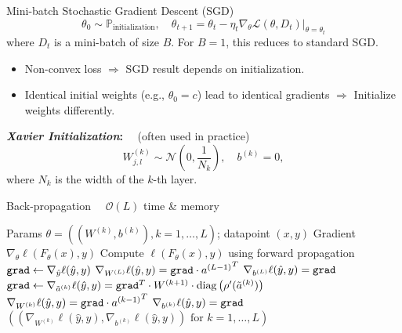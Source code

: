 \documentclass[a4paper,10pt]{article}
\newenvironment{myitemize}
{\vspace{-0.25cm}\begin{itemize}}
{\end{itemize}}
\begin{document}
\begin{small}
\begin{subbox}{Mini-batch Stochastic Gradient Descent (SGD)}
    \vspace{-0.3cm}
    $$
    \theta_0 \sim \mathbb{P}_{\text{initialization}}, \quad \theta_{t+1} = \theta_t - \eta_t \nabla_{\theta} \mathcal{L}(\theta, D_{t}) \big|_{\theta = \theta_t}
    $$
    where \( D_t \) is a mini-batch of size \( B \). For \( B = 1 \), this reduces to standard SGD.
\end{subbox}

\begin{myitemize}
    \item Non-convex loss $\Rightarrow$ SGD result depends on initialization.
    \item Identical initial weights (e.g., $\theta_0 = c$) lead to identical gradients $\Rightarrow$ Initialize weights differently.
\end{myitemize}

\textbf{\textit{Xavier Initialization}:} \ \ (often used in practice)
$$
W^{(k)}_{j,l} \sim \mathcal{N}\left(0, \frac{1}{N_k}\right), \quad b^{(k)} = 0,
$$
where $N_k$ is the width of the $k$-th layer.

\begin{algorithm}
\footnotesize
\caption{Back-propagation $\quad \mathcal{O}(L)$ time \& memory}
\begin{algorithmic}[1]
\Require Params $\theta = \left( \left(W^{(k)}, b^{(k)}\right), k = 1, \dots, L \right)$; datapoint $(x, y)$
\Ensure Gradient $\nabla_{\theta} \ell(F_{\theta}(x), y)$
\State Compute $\ell(F_{\theta}(x), y)$ using forward propagation
\State $\text{\texttt{grad}} \gets \nabla_{\hat{y}} \ell(\hat{y}, y)$
\State $\nabla_{W^{(L)}} \ell(\hat{y}, y) = \text{\texttt{grad}} \cdot {a^{(L-1)}}^{T}$
\State $\nabla_{b^{(L)}} \ell(\hat{y}, y) = \text{\texttt{grad}}$
    \State $\text{\texttt{grad}} \gets \nabla_{\tilde{a}^{(k)}} \ell(\hat{y}, y) = \text{\texttt{grad}}^{T} \cdot W^{(k+1)} \cdot \text{diag} \left( \rho'(\tilde{a}^{(k)}) \right)$
    \State $\nabla_{W^{(k)}} \ell(\hat{y}, y) = \text{\texttt{grad}} \cdot {a^{(k-1)}}^{T}$
    \State $\nabla_{b^{(k)}} \ell(\hat{y}, y) = \text{\texttt{grad}}$
\EndFor
\State \Return $\left( \left( \nabla_{W^{(k)}} \ell(\hat{y}, y), \nabla_{b^{(k)}} \ell(\hat{y}, y) \right) \text{ for } k = 1, \dots, L \right)$
\end{algorithmic}
\end{algorithm}

\newpage


\end{small}
\end{document}
